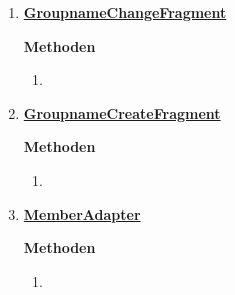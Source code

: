 \begin{enumerate}
	\item \textbf{\underline{GroupnameChangeFragment}}
	
	
	\textbf{Methoden}	
	\begin{enumerate}
		\item 
		
	\end{enumerate}

	\item \textbf{\underline{GroupnameCreateFragment}}
	
	
	\textbf{Methoden}
	
	\begin{enumerate}
		\item 
		
	\end{enumerate}
	\item \textbf{\underline{MemberAdapter}}
	
	
	\textbf{Methoden}
	\begin{enumerate}
		\item 
		
	\end{enumerate}


\end{enumerate}